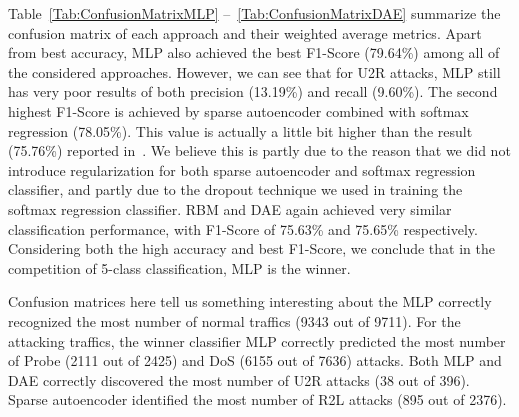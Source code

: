 Table~\ref{Tab:ConfusionMatrixMLP} --~\ref{Tab:ConfusionMatrixDAE} summarize the confusion matrix
of each approach and their weighted average metrics.
Apart from best accuracy, MLP also achieved the best F1-Score (79.64\%)
among all of the considered approaches.
However, we can see that for U2R attacks, MLP still has very poor results of
both precision (13.19\%) and recall (9.60\%).
The second highest F1-Score is achieved by sparse autoencoder combined with softmax regression (78.05\%).
This value is actually a little bit higher than the result (75.76\%) reported in~\cite{STL-NIDS}.
We believe this is partly due to the reason that we did not introduce regularization
for both sparse autoencoder and softmax regression classifier,
and partly due to the dropout technique we used in training the softmax regression classifier.
RBM and DAE again achieved very similar classification performance,
with F1-Score of 75.63\% and 75.65\% respectively.
Considering both the high accuracy and best F1-Score, we conclude that in the competition of
5-class classification, MLP is the winner.

Confusion matrices here tell us something interesting about the 
MLP correctly recognized the most number of normal traffics (9343 out of 9711).
For the attacking traffics, the winner classifier MLP correctly predicted the most
number of Probe (2111 out of 2425) and DoS (6155 out of 7636) attacks.
Both MLP and DAE correctly discovered the most number of U2R attacks (38 out of 396).
Sparse autoencoder identified the most number of R2L attacks (895 out of 2376).

